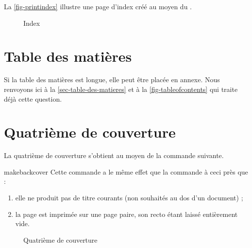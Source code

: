 La \vref{fig-printindex} illustre une page d'index créé au moyen du
.

\begin{figure}[htbp]
  \centering
  \caption{Index}
  \label{fig-printindex}
\end{figure}

\section{Table des matières}

Si la table des matières est longue, elle peut être placée en
annexe. Nous renvoyons ici à la \vref{sec-table-des-matieres} et à
la \vref{fig-tableofcontents} qui traite déjà cette question.

\section{Quatrième de couverture}\label{sec-quatr-de-couv}

La quatrième de couverture s'obtient au moyen de la commande
 suivante.

\begin{docCommand}{makebackcover}{}
  Cette commande a le même effet que la commande 
  à ceci près que :
  \begin{enumerate}
  \item elle ne produit pas de titre courants (non souhaités au dos d'un
    document) ;
  \item la page est imprimée sur une page paire, son recto étant
    laissé entièrement vide.
  \end{enumerate}
\end{docCommand}

\begin{figure}[htbp]
  \centering
  \caption{Quatrième de couverture}
  \label{fig-makebackcover}
\end{figure}

%
\iffalse
\fi
